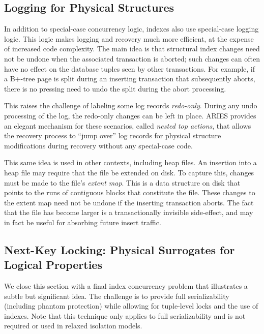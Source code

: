 \documentclass[b5paper,11pt,twoside,openright]{book}
\begin{document}
\hypertarget{logging-for-physical-structures}{%
\subsection{Logging for Physical
Structures}\label{logging-for-physical-structures}}

In addition to special-case concurrency logic, indexes also use
special-case logging logic. This logic makes logging and recovery much
more efficient, at the expense of increased code complexity. The main
idea is that structural index changes need not be undone when the
associated transaction is aborted; such changes can often have no effect
on the database tuples seen by other transactions. For example, if a
B+-tree page is split during an inserting transaction that subsequently
aborts, there is no pressing need to undo the split during the abort
processing.

This raises the challenge of labeling some log records \emph{redo-only}.
During any undo processing of the log, the redo-only changes can be left
in place. ARIES provides an elegant mechanism for these scenarios,
called \emph{nested top actions}, that allows the recovery process to
``jump over'' log records for physical structure modifications during
recovery without any special-case code.

This same idea is used in other contexts, including heap files. An
insertion into a heap file may require that the file be extended on
disk. To capture this, changes must be made to the file's \emph{extent
map}. This is a data structure on disk that points to the runs of
contiguous blocks that constitute the file. These changes to the extent
map need not be undone if the inserting transaction aborts. The fact
that the file has become larger is a transactionally invisible
side-effect, and may in fact be useful for absorbing future insert
traffic.

\hypertarget{next-key-locking-physical-surrogates-for-logical-properties}{%
\subsection{Next-Key Locking: Physical Surrogates for Logical
Properties}\label{next-key-locking-physical-surrogates-for-logical-properties}}

We close this section with a final index concurrency problem that
illustrates a subtle but significant idea. The challenge is to provide
full serializability (including phantom protection) while allowing for
tuple-level locks and the use of indexes. Note that this technique only
applies to full serializability and is not required or used in relaxed
isolation models.
\end{document}
